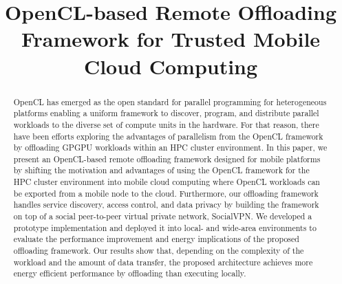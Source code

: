 \documentclass[10pt, conference, compsocconf]{IEEEtran}
\begin{document}


\title{OpenCL-based Remote Offloading Framework for Trusted Mobile
Cloud Computing}


\author{
\and
{}
}

\maketitle

\begin{abstract}
%
OpenCL has emerged as the open standard for parallel programming for
heterogeneous platforms enabling a uniform framework to discover,
program, and distribute parallel workloads to the diverse set of compute
units in the hardware.
%
For that reason, there have been efforts exploring the advantages of
parallelism from the OpenCL framework by offloading GPGPU workloads
within an HPC cluster environment.
%
In this paper, we present an OpenCL-based remote offloading framework
designed for mobile platforms by shifting the motivation and
advantages of using the OpenCL framework for the HPC cluster environment
into mobile cloud computing where OpenCL workloads can be exported from
a mobile node to the cloud.
%
Furthermore, our offloading framework handles service discovery, access
control, and data privacy by building the framework on top of a social
peer-to-peer virtual private network, SocialVPN. 
%
We developed a prototype implementation and deployed it into local- and
wide-area environments to evaluate the performance improvement and
energy implications of the proposed offloading framework.
%
Our results show that, depending on the complexity of the workload and
the amount of data transfer, the proposed architecture achieves more
energy efficient performance by offloading than executing locally.
\end{abstract}
\end{document}
